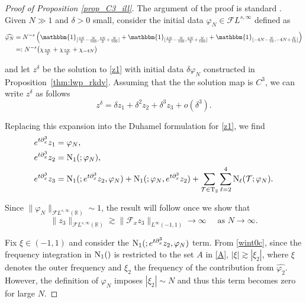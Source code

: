 \documentclass[%
11pt,  reqno]{amsart}
\makeatletter
\newcommand{\III}{\textup{I \hspace{-2.9mm} I \hspace{-2.9mm} I}}
\newcommand{\5}{\textup{V}}
\newcommand{\noi}{\noindent}
\newcommand{\ft}{\widehat}
\newcommand{\F}{\mathcal{F}}
\newcommand{\dx}{\partial_x}
\theoremstyle{remark}
\newcommand{\R}{\mathbb{R}}
\newcommand{\TT}{\mathcal{T}}
\newcommand{\Tr}{\mathrm{T}}
\newcommand{\gfrak}{\mathfrak{g}}
\renewcommand{\l}{\ell}
\def\<#1>{\csname MH@symb@#1\endcsname}
\numberwithin{equation}{section}
\numberwithin{theorem}{section}
\newcommand{\NN}{\mathrm{N}}
\makeatother
\begin{document}
\begin{proof}[Proof of Proposition \ref{prop_C3_ill}]
The argument of the proof is standard \cite{taobejenaru, bou_ill_kdv, MolTzeSaut_ill, Tzvetkov_ill}.
    Given $N\gg 1$ and $\delta>0$ small, consider the initial data $\varphi_N\in \mathcal{F}L^{s,\infty}$ defined as
\begin{align}
        \widehat{\varphi_N}&=N^{-s}\left(\mathbbm{1}_{[\frac{3N}{2}-\frac{N}{100}, \frac{3N}{2}+\frac{N}{100}]} + \mathbbm{1}_{[\frac{5N}{2}-\frac{N}{100}, \frac{5N}{2}+\frac{N}{100}]} + \mathbbm{1}_{[-4N-\frac{N}{10}, -4N+\frac{N}{10}]}\right)\\
        &=: N^{-s} \big(\chi_{\frac{3N}2}+ \chi_{\frac{5N}2} + \chi_{-4N} \big)
\end{align}

\noi
    and let $z^\delta$ be the solution to \eqref{z1} with initial data $\delta \varphi_N $ constructed in Proposition~\ref{thm:lwp_rkdv}. Assuming that the the solution map is $C^3$, we can write $z^\delta$ as follows
    $$
    z^\delta = \delta z_1 + \delta^2z_2 + \delta^3 z_3 + o(\delta^3).
    $$

    \noi 
    Replacing this expansion into the Duhamel formulation for \eqref{z1}, we find 
    \begin{align}
        e^{t\dx^3} z_1 &= \varphi_N 
        , 
        \\
        e^{t\dx^3} z_2 &= \NN_1(\<1>;  \varphi_N ) 
        , 
        \\
        e^{t\dx^3} z_3 &= \NN_1(\<1>; e^{t\dx^3} {z}_2, {\varphi_N}) + \NN_1(\<1>;  {\varphi_N}, e^{t\dx^3}{z}_2)
         + \sum_{\TT\in \Tr_2}\sum_{\l=2}^4\NN_\l(\TT; {\varphi_N}) 
        .
        \label{eq:z3}
    \end{align}

    
    \noi
    Since $\|\varphi_N\|_{\F L^{s,\infty}(\R)}\sim 1$,
    the result will follow once we show that 
   $$
    \|z_3\|_{\F L^{s,\infty}(\R)} \gtrsim \|\F_xz_3\|_{ L^{\infty}(-1,1)}\to \infty \quad \mbox{ as }N\to \infty.
    $$


Fix $\xi\in(-1,1)$ and consider the $\NN_1(\<1>; e^{t\dx^3}{z}_2, {\varphi_N})$ term.
From \eqref{wint0c}, since the frequency integration in $\NN_1(\<1>)$ is restricted to the set $A$ in \eqref{A}, $|\xi|\gtrsim |\xi_2|$, where $\xi$ denotes the outer frequency and $\xi_2$ the frequency of the contribution from $\ft{\varphi_2}$. However, the definition of $\varphi_N$ imposes $|\xi_2|\sim N$ and thus this term becomes zero for large $N$. 


\end{proof}
\end{document}
